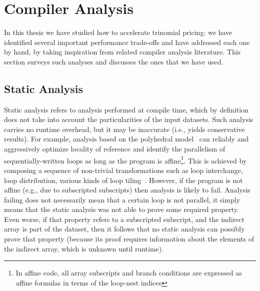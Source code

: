 \section{Compiler Analysis}
\label{relwork-analysis}

In this thesis we have studied how to accelerate trinomial pricing: we have identified several important performance trade-offs and have addressed each one by hand, by taking inspiration from related compiler analysis literature.
This section surveys such analyses and discusses the ones that we have used.


\subsection{Static Analysis}
\label{relwork-static}

Static analysis refers to analysis performed at compile time, which by definition does not take into account the particularities of the input datasets. Such analysis carries no runtime overhead, but it may be inaccurate (i.e., yields conservative results).   For example, analysis based on the polyhedral model~\cite{PolyhedralOpt,PolyPluto1,PolyPluto2} can reliably and aggressively optimize locality of reference and identify the parallelism of sequentially-written loops as long as the program is affine\footnote{In affine code, all array subscripts and branch conditions are expressed as affine formulas in terms of the loop-nest indices}.  This is achieved by composing a sequence of non-trivial transformations such as loop interchange, loop distribution, various kinds of loop tiling~\cite{HexaTiling}.  However, if the program is not affine (e.g., due to subscripted subscripts) then analysis is likely to fail. Analysis failing does not necessarily mean that a certain loop is not parallel, it simply means that the static analysis was not able to prove some required property. Even worse, if that property refers to a subscripted subscript, and the indirect array is part of the dataset, then it follows that no static analysis can possibly prove that property (because its proof requires information about the elements of the indirect array, which is unknown until runtime). 

